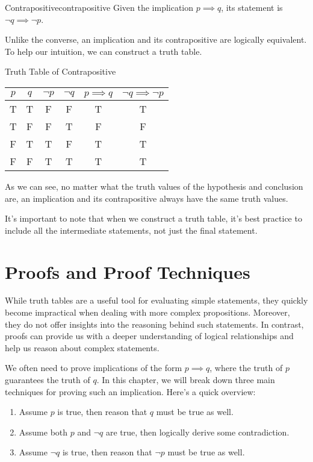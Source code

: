 \begin{dfnbox}{Contrapositive}{contrapositive}
    Given the implication $p \implies q$, its  statement is $\neg q \implies \neg p$.
\end{dfnbox}

Unlike the converse, an implication and its contrapositive are logically equivalent. To help our intuition, we can construct a truth table.

\begin{exbox}{Truth Table of Contrapositive}{}
    \begin{center}\begin{tabular}{c | c || c | c | c | c}
        $p$ & $q$ & $\neg p$ & $\neg q$ & $p \implies q$ & $\neg q \implies \neg p$ \\ \hline
        T & T & F & F & T & T \\
        T & F & F & T & F & F \\
        F & T & T & F & T & T \\
        F & F & T & T & T & T
    \end{tabular}\end{center}
\end{exbox}

As we can see, no matter what the truth values of the hypothesis and conclusion are, an implication and its contrapositive always have the same truth values.

\begin{notebox}
    It's important to note that when we construct a truth table, it's best practice to include all the intermediate statements, not just the final statement.
\end{notebox}


\section{Proofs and Proof Techniques}
While truth tables are a useful tool for evaluating simple statements, they quickly become impractical when dealing with more complex propositions. Moreover, they do not offer insights into the reasoning behind such statements. In contrast, proofs can provide us with a deeper understanding of logical relationships and help us reason about complex statements.

We often need to prove implications of the form $p \implies q$, where the truth of $p$ guarantees the truth of $q$. In this chapter, we will break down three main techniques for proving such an implication. Here's a quick overview:
\begin{enumerate}
    \item {} Assume $p$ is true, then reason that $q$ must be true as well.
    \item {} Assume both $p$ and $\neg q$ are true, then logically derive some contradiction.
    \item {} Assume $\neg q$ is true, then reason that $\neg p$ must be true as well.
\end{enumerate}

